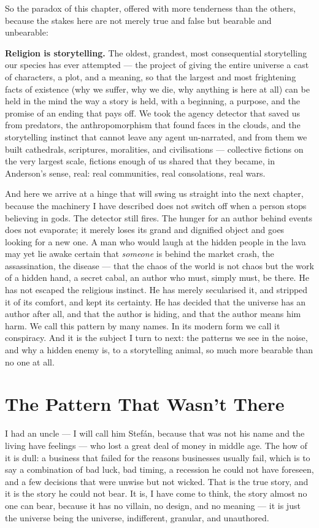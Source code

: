 So the paradox of this chapter, offered with more tenderness than the others, because the stakes here are not merely true and false but bearable and unbearable:

\textbf{Religion is storytelling.} The oldest, grandest, most consequential storytelling our species has ever attempted — the project of giving the entire universe a cast of characters, a plot, and a meaning, so that the largest and most frightening facts of existence (why we suffer, why we die, why anything is here at all) can be held in the mind the way a story is held, with a beginning, a purpose, and the promise of an ending that pays off. We took the agency detector that saved us from predators, the anthropomorphism that found faces in the clouds, and the storytelling instinct that cannot leave any agent un-narrated, and from them we built cathedrals, scriptures, moralities, and civilisations — collective fictions on the very largest scale, fictions enough of us shared that they became, in Anderson's sense, real: real communities, real consolations, real wars.

And here we arrive at a hinge that will swing us straight into the next chapter, because the machinery I have described does not switch off when a person stops believing in gods. The detector still fires. The hunger for an author behind events does not evaporate; it merely loses its grand and dignified object and goes looking for a new one. A man who would laugh at the hidden people in the lava may yet lie awake certain that \emph{someone} is behind the market crash, the assassination, the disease — that the chaos of the world is not chaos but the work of a hidden hand, a secret cabal, an author who must, simply must, be there. He has not escaped the religious instinct. He has merely secularised it, and stripped it of its comfort, and kept its certainty. He has decided that the universe has an author after all, and that the author is hiding, and that the author means him harm. We call this pattern by many names. In its modern form we call it conspiracy. And it is the subject I turn to next: the patterns we see in the noise, and why a hidden enemy is, to a storytelling animal, so much more bearable than no one at all.

\chapter{The Pattern That Wasn't There}

I had an uncle — I will call him Stefán, because that was not his name and the living have feelings — who lost a great deal of money in middle age. The how of it is dull: a business that failed for the reasons businesses usually fail, which is to say a combination of bad luck, bad timing, a recession he could not have foreseen, and a few decisions that were unwise but not wicked. That is the true story, and it is the story he could not bear. It is, I have come to think, the story almost no one can bear, because it has no villain, no design, and no meaning — it is just the universe being the universe, indifferent, granular, and unauthored.

